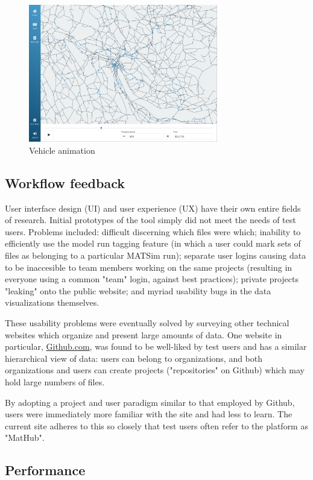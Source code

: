 \documentclass[Afour,sagev,times]{sagej}
\begin{document}
\begin{figure}
\centering
\includegraphics[width=3.25in]{fig-7.png}
\caption{Vehicle animation}\label{Fanim}
\end{figure}

\subsection{Workflow feedback}

User interface design (UI) and user experience (UX) have their own entire fields of research. Initial prototypes of the tool simply did not meet the needs of test users. Problems included: difficult discerning which files were which; inability to efficiently use the model run tagging feature (in which a user could mark sets of files as belonging to a particular MATSim run); separate user logins causing data to be inaccesible to team members working on the same projects (resulting in everyone using a common "team" login, against best practices); private projects "leaking" onto the public website; and myriad usability bugs in the data visualizations themselves.

These usability problems were eventually solved by surveying other technical websites which organize and present large amounts of data. One website in particular, \url{Github.com}, was found to be well-liked by test users and has a similar hierarchical view of data: users can belong to organizations, and both organizations and users can create projects ("repositories" on Github) which may hold large numbers of files.

By adopting a project and user paradigm similar to that employed by Github, users were immediately more familiar with the site and had less to learn. The current site adheres to this so closely that test users often refer to the platform as "MatHub".

\subsection{Performance}
\end{document}
